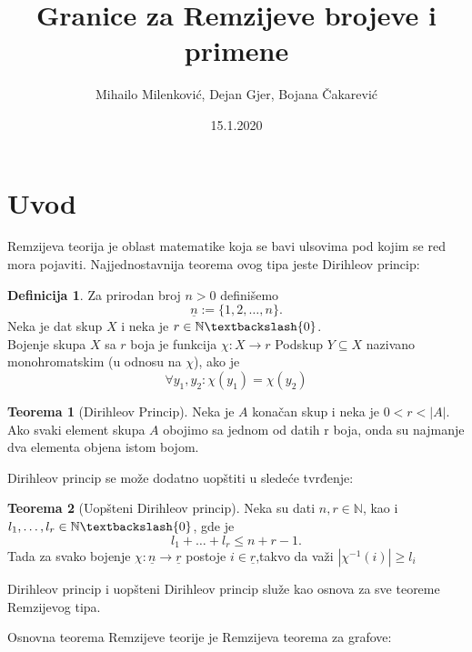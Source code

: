 \documentclass{article}
\title{Granice za Remzijeve brojeve i primene}
\date{15.1.2020}
\author{Mihailo Milenković, Dejan Gjer, Bojana Čakarević}
\theoremstyle{definition}
\newtheorem{definicija}{Definicija}[section]
\newtheorem{teorema}{Teorema}[section]
\begin{document}
	
	\maketitle
	
	\newpage
	
	\tableofcontents
	
	\newpage
	
	\section{Uvod}
	
	Remzijeva teorija je oblast matematike koja se bavi ulsovima pod kojim se red mora pojaviti. Najjednostavnija teorema ovog tipa jeste Dirihleov princip:
	
	\begin{definicija}
		Za prirodan broj $n>0$ definišemo 
		\[
		\underline{n}:=\{1,2,\ldots,n\}.
		\]
		Neka je dat skup $X$ i neka je $r\in \mathbb{N}\textbackslash \{0\}$.\\	
		Bojenje skupa $X$ sa $r$ boja je funkcija $\chi:X\rightarrow r$
		Podskup $Y\subseteq X$ nazivano monohromatskim (u odnosu na $\chi$), ako je
		\[
		\forall y_1,y_2:\chi(y_1)=\chi(y_2)
		\]
	\end{definicija}
	\begin{teorema}[Dirihleov Princip]
		Neka je $A$ konačan skup i neka je $0<r<|A|$.\\ Ako svaki element skupa $A$ obojimo sa jednom od datih r boja, onda su najmanje dva elementa objena istom bojom.
	\end{teorema}
	
	
	Dirihleov princip se može dodatno uopštiti u sledeće tvrđenje:
	\begin{teorema}[Uopšteni Dirihleov princip]
		Neka su dati $n,r \in \mathbb{N}$, kao i $l_1,\ldots,l_r \in \mathbb{N}\textbackslash\{0\}$, gde je
		\[
		l_1+\ldots+l_r\leq n+r-1.
		\]
		Tada za svako bojenje $\chi:\underline{n}\rightarrow\underline{r}$ postoje $i\in \underline{r}$,takvo da važi $|\chi^{-1}(i)|\geq l_i$
	\end{teorema}
	
	Dirihleov princip i uopšteni Dirihleov princip služe kao osnova za sve teoreme Remzijevog tipa.
	
	Osnovna teorema Remzijeve teorije je Remzijeva teorema za grafove:
	
\end{document}
